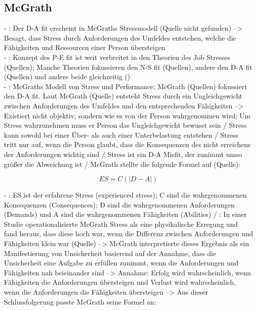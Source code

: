 \subsection{McGrath}
\label{ch:notizen:jobStress:mcgrath}
- \cite[S. 2f.]{edwards:1990}: Der D-A fit erscheint in McGraths Stressmodell (Quelle nicht gefunden) --> Besagt, dass Stress durch Anforderungen des Umfeldes entstehen, welche die Fähigkeiten und Ressourcen einer Person übersteigen \\
- \cite[S. 16]{edwards:2008}: Konzept des P-E fit ist weit verbreitet in den Theorien des Job Stresses (Quellen); Manche Theorien fokussieren den N-S fit (Quellen), andere den D-A fit (Quellen) und andere beide gleichzeitig (\cite{mechanismsOfJobStressAndStrain:1982}) \\
- \cite[S. 16]{edwards:2008}: McGraths Modell von Stress und Performance: McGrath (Quellen) fokussiert den D-A fit. Laut McGrath (Quelle) entsteht Stress durch ein Ungleichgewicht zwischen Anforderungen des Umfeldes und den entsprechenden Fähigkeiten --> Existiert nicht objektiv, sondern wie es von der Person wahrgenommen wird; Um Stress wahrzunehmen muss er Person das Ungleichgewicht bewusst sein / Stress kann sowohl bei einer Über- als auch einer Unterbelastung entstehen / Stress tritt nur auf, wenn die Person glaubt, dass die Konsequenzen des nicht erreichens der Anforderungen wichtig sind / Stress ist ein D-A Misfit, der zunimmt umso größer die Abweichung ist / McGrath stellte die folgende Formel auf (Quelle):

\begin{equation}
	ES = C(|D-A|)
	\label{fig:formel2}
\end{equation}

- \cite[S. 16]{edwards:2008}: ES ist der erfahrene Stress (experienced stress); C sind die wahrgenommenen Konsequenzen (Consequences); D sind die wahrgenommenen Anforderungen (Demands) und A sind die wahrgenommenen Fähigkeiten (Abilities) / \cite[S. 17]{edwards:2008}: In einer Studie operationalisierte McGrath Stress als eine physikalische Erregung und fand heraus, dass diese hoch war, wenn die Differenz zwischen Anforderungen und Fähigkeiten klein war (Quelle) --> McGrath interpretierte dieses Ergebnis als ein Manifestierung von Unsicherheit basierend auf der Annahme, dass die Unsicherheit eine Aufgabe zu erfüllen zunimmt, wenn die Anforderungen und Fähigkeiten nah beieinander sind --> Annahme: Erfolg wird wahrscheinlich, wenn Fähigkeiten die Anforderungen übersteigen und Verlust wird wahrscheinlich, wenn die Anforderungen die Fähigkeiten übersteigen --> Aus dieser Schlussfolgerung passte McGrath seine Formel an:

